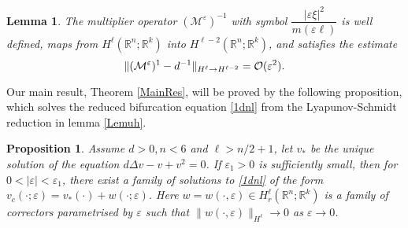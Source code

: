 \documentclass[letterpaper,11pt]{article}
\newcommand{\R}{\mathbb{R}}
\newcommand{\rmO}{\mathcal{O}}
\newcommand{\eps}{\varepsilon}
\newcommand{\M}{\mathcal{M}}
\numberwithin{equation}{section}
\theoremstyle{plain}
\newtheorem{proposition}[theorem]{Proposition}
\newtheorem{lemma}[theorem]{Lemma}
\theoremstyle{remark}
\begin{document}
\begin{lemma}\label{estmult}The multiplier operator $(\M^\eps)^{-1}$ with symbol $\dfrac{|\eps\xi|^2}{m(\eps\ell)}$ is well defined, maps from $H^\ell  (\R^n;\R^k)$ into $H^{\ell-2} (\R^n;\R^k)$, and satisfies the estimate
\[
\|(\M^\eps)^{\-1}-d^{-1}\|_{H^\ell \to H^{\ell-2}} = \rmO(\eps^2).
\]
\end{lemma}
Our main result, Theorem \ref{MainRes}, will be proved by the following proposition, which solves the reduced bifurcation equation \eqref{1dnl} from the Lyapunov-Schmidt reduction in lemma \ref{Lemuh}.


\begin{proposition}\label{prop}Assume $d>0, n<6$ and $\ell>n/2+1$, let $v_*$ be the unique  solution of the equation $d\Delta v - v +v^2 = 0$. If $\eps_1>0$ is sufficiently small, then for $0<|\eps|<\eps_1$, there exist a family of solutions to \eqref{1dnl} of the form $v_c(\cdot;\eps) = v_*(\cdot)+w(\cdot; \eps)$. Here $w=w(\cdot,\eps) \in H^{\ell}_{r}(\R^n;\R^k)$ is a family of correctors parametrised by $\eps $ such that $\|w(\cdot,\eps)\|_{H^\ell} \to 0$ as $\eps \to 0$.
\end{proposition}




\end{document}
